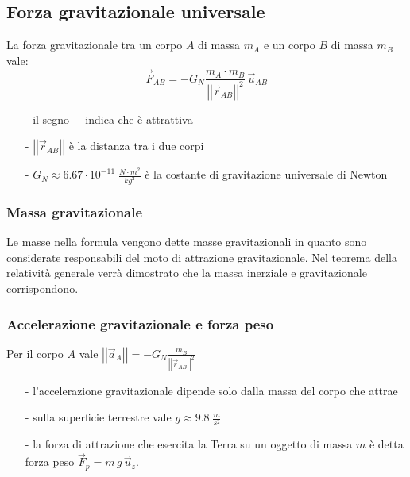 \documentclass[a4paper]{article}
\newcommand\uz{\vec{u}_z}
\newcommand\vmod[1]{\left|\left|{#1}\right|\right|}
\begin{document}
\newpage


\subsection{Forza gravitazionale universale}
La forza gravitazionale tra un corpo \(A\) di massa \(m_A\) e un corpo \(B\) di massa \(m_B\) vale:
\[\vec{F}_{AB} = - G_N \frac{m_A \cdot m_B}{\vmod{\vec{r}_{AB}}^2} \, \vec{u}_{AB}\]

\begin{itemize}[topsep=3pt, itemsep=0pt]
	\item[-] il segno \(-\) indica che è attrattiva
	\item[-] \(\vmod{\vec{r}_{AB}}\) è la distanza tra i due corpi
	\item[-] \(\displaystyle G_N \approx 6.67 \cdot 10^{-11} \; \frac{N \cdot m^2}{kg^2}\) è la costante di gravitazione universale di Newton
\end{itemize}

\subsubsection*{Massa gravitazionale}
Le masse nella formula vengono dette masse gravitazionali in quanto sono considerate responsabili del moto di attrazione gravitazionale.
Nel teorema della relatività generale verrà dimostrato che la massa inerziale e gravitazionale corrispondono.

\subsubsection*{Accelerazione gravitazionale e forza peso}
Per il corpo \(A\) vale \(\displaystyle \vmod{\vec{a}_A} = -G_N \frac{m_B}{\vmod{\vec{r}_{AB}}^2}\)

\begin{itemize}[topsep=3pt, itemsep=0pt]
	\item[-] l'accelerazione gravitazionale dipende solo dalla massa del corpo che attrae
	\item[-] sulla superficie terrestre vale \(\displaystyle g \approx 9.8 \; \frac{m}{s^2}\)
	\item[-] la forza di attrazione che esercita la Terra su un oggetto di massa \(m\) è detta forza peso \(\vec{F}_p = m \, g \, \uz\).
\end{itemize}
\end{document}
